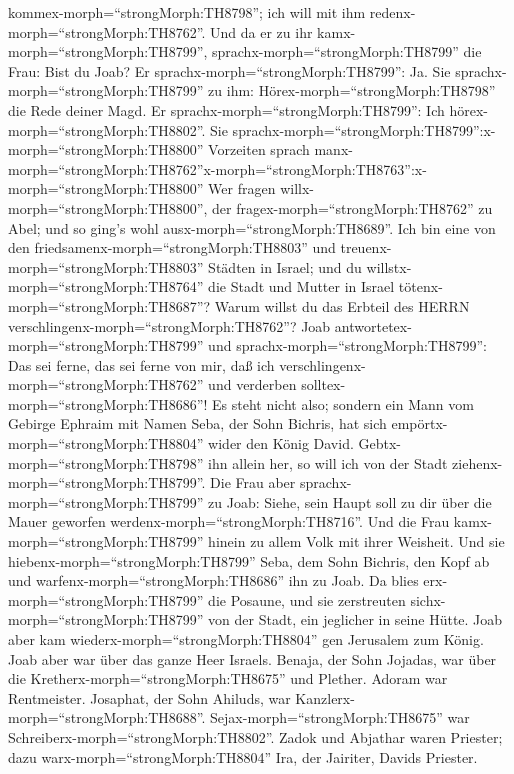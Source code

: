 kommex-morph=``strongMorph:TH8798''; ich will mit ihm
redenx-morph=``strongMorph:TH8762''.  Und da er zu ihr
kamx-morph=``strongMorph:TH8799'', sprachx-morph=``strongMorph:TH8799''
die Frau: Bist du Joab? Er sprachx-morph=``strongMorph:TH8799'': Ja. Sie
sprachx-morph=``strongMorph:TH8799'' zu ihm:
Hörex-morph=``strongMorph:TH8798'' die Rede deiner Magd. Er
sprachx-morph=``strongMorph:TH8799'': Ich
hörex-morph=``strongMorph:TH8802''.  Sie
sprachx-morph=``strongMorph:TH8799'':x-morph=``strongMorph:TH8800''
Vorzeiten sprach
manx-morph=``strongMorph:TH8762''x-morph=``strongMorph:TH8763'':x-morph=``strongMorph:TH8800''
Wer fragen willx-morph=``strongMorph:TH8800'', der
fragex-morph=``strongMorph:TH8762'' zu Abel; und so ging's wohl
ausx-morph=``strongMorph:TH8689''.  Ich bin eine von den
friedsamenx-morph=``strongMorph:TH8803'' und
treuenx-morph=``strongMorph:TH8803'' Städten in Israel; und du
willstx-morph=``strongMorph:TH8764'' die Stadt und Mutter in Israel
tötenx-morph=``strongMorph:TH8687''? Warum willst du das Erbteil des
HERRN verschlingenx-morph=``strongMorph:TH8762''?  Joab
antwortetex-morph=``strongMorph:TH8799'' und
sprachx-morph=``strongMorph:TH8799'': Das sei ferne, das sei ferne von
mir, daß ich verschlingenx-morph=``strongMorph:TH8762'' und verderben
solltex-morph=``strongMorph:TH8686''! Es steht nicht also; 
sondern ein Mann vom Gebirge Ephraim mit Namen Seba, der Sohn Bichris,
hat sich empörtx-morph=``strongMorph:TH8804'' wider den König David.
Gebtx-morph=``strongMorph:TH8798'' ihn allein her, so will ich von der
Stadt ziehenx-morph=``strongMorph:TH8799''. Die Frau aber
sprachx-morph=``strongMorph:TH8799'' zu Joab: Siehe, sein Haupt soll zu
dir über die Mauer geworfen werdenx-morph=``strongMorph:TH8716''.
 Und die Frau kamx-morph=``strongMorph:TH8799'' hinein zu
allem Volk mit ihrer Weisheit. Und sie
hiebenx-morph=``strongMorph:TH8799'' Seba, dem Sohn Bichris, den Kopf ab
und warfenx-morph=``strongMorph:TH8686'' ihn zu Joab. Da blies
erx-morph=``strongMorph:TH8799'' die Posaune, und sie zerstreuten
sichx-morph=``strongMorph:TH8799'' von der Stadt, ein jeglicher in seine
Hütte. Joab aber kam wiederx-morph=``strongMorph:TH8804'' gen Jerusalem
zum König.  Joab aber war über das ganze Heer Israels.
Benaja, der Sohn Jojadas, war über die
Kretherx-morph=``strongMorph:TH8675'' und Plether.  Adoram
war Rentmeister. Josaphat, der Sohn Ahiluds, war
Kanzlerx-morph=``strongMorph:TH8688''. 
Sejax-morph=``strongMorph:TH8675'' war
Schreiberx-morph=``strongMorph:TH8802''. Zadok und Abjathar waren
Priester;  dazu warx-morph=``strongMorph:TH8804'' Ira, der
Jairiter, Davids Priester.

